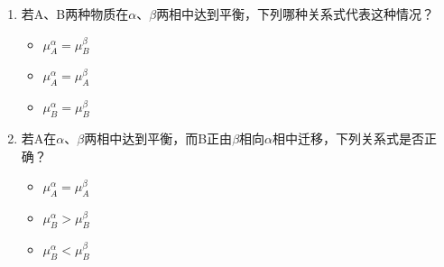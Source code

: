 \begin{frame}[t]{}
    \begin{example}
        \begin{enumerate}
          \item 若A、B两种物质在$\alpha $、$\beta $两相中达到平衡，下列哪种关系式代表这种情况？
          \begin{itemize}
              \item[A.] $\mu_A^\alpha = \mu_B^\beta$
              \item[B.] $\mu_A^\alpha = \mu_A^\beta$
              \item[C.] $\mu_B^\alpha = \mu_B^\beta$
            \end{itemize}
        \item 若A在$\alpha $、$\beta $两相中达到平衡，而B正由$\beta $相向$\alpha $相中迁移，下列关系式是否正确？
        \begin{itemize}
            \item[A.] $\mu_A^\alpha = \mu_A^\beta$
            \item[B.] $\mu_B^\alpha > \mu_B^\beta$
            \item[C.] $\mu_B^\alpha < \mu_B^\beta$
        \end{itemize}
          
        \end{enumerate}
    \end{example}
\end{frame}